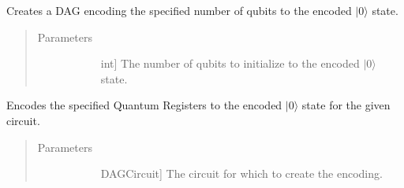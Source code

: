 \documentclass[letterpaper,10pt,english]{sphinxmanual}
\begin{document}
\begin{fulllineitems}
\begin{fulllineitems}
\begin{quote}
\begin{description}
\begin{description}
\end{description}

\end{description}\end{quote}

\end{fulllineitems}


\begin{fulllineitems}
\label{\detokenize{Base:BaseFaultTolerance.Encoder.createEncoderDag}}
\sphinxAtStartPar
Creates a DAG encoding the specified number of qubits to the encoded \(|0\rangle\) state.
\begin{quote}\begin{description}
\item[{Parameters}] \leavevmode\begin{description}
\item[{}] \leavevmode{[}int{]}
\sphinxAtStartPar
The number of qubits to initialize to the encoded \(|0\rangle\) state.

\end{description}

\end{description}\end{quote}

\end{fulllineitems}


\begin{fulllineitems}
\label{\detokenize{Base:BaseFaultTolerance.Encoder.getEncoderCircuit}}
\sphinxAtStartPar
Encodes the specified Quantum Registers to the encoded \(|0\rangle\) state for the given circuit.
\begin{quote}\begin{description}
\item[{Parameters}] \leavevmode\begin{description}
\item[{}] \leavevmode{[}DAGCircuit{]}
\sphinxAtStartPar
The circuit for which to create the encoding.


\end{description}
\end{description}
\end{quote}
\end{fulllineitems}
\end{fulllineitems}
\end{document}
